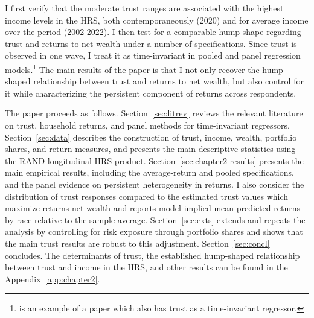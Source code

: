 \par I first verify that the moderate trust ranges are associated with the highest income levels in the HRS, both contemporaneously (2020) and for average income over the period (2002-2022). I then test for a comparable hump shape regarding trust and returns to net wealth under a number of specifications. Since trust is observed in one wave, I treat it as time-invariant in pooled and panel regression models.\footnote{\cite{Lesmeister2019} is an example of a paper which also has trust as a time-invariant regressor.} The main results of the paper is that I not only recover the hump-shaped relationship between trust and returns to net wealth, but also control for it while characterizing the persistent component of returns across respondents. 

\par The paper proceeds as follows. Section~\ref{sec:litrev} reviews the relevant literature on trust, household returns, and panel methods for time-invariant regressors. Section~\ref{sec:data} describes the construction of trust, income, wealth, portfolio shares, and return measures, and presents the main descriptive statistics using the RAND longitudinal HRS product. Section~\ref{sec:chapter2-results} presents the main empirical results, including the average-return and pooled specifications, and the panel evidence on persistent heterogeneity in returns. I also consider the distribution of trust responses compared to the estimated trust values which maximize returns net wealth and reports model-implied mean predicted returns by race relative to the sample average. Section~\ref{sec:exts} extends and repeats the analysis by controlling for risk exposure through portfolio shares and shows that the main trust results are robust to this adjustment. Section~\ref{sec:concl} concludes. The determinants of trust, the established hump-shaped relationship between trust and income in the HRS, and other results can be found in the Appendix~\ref{app:chapter2}.
